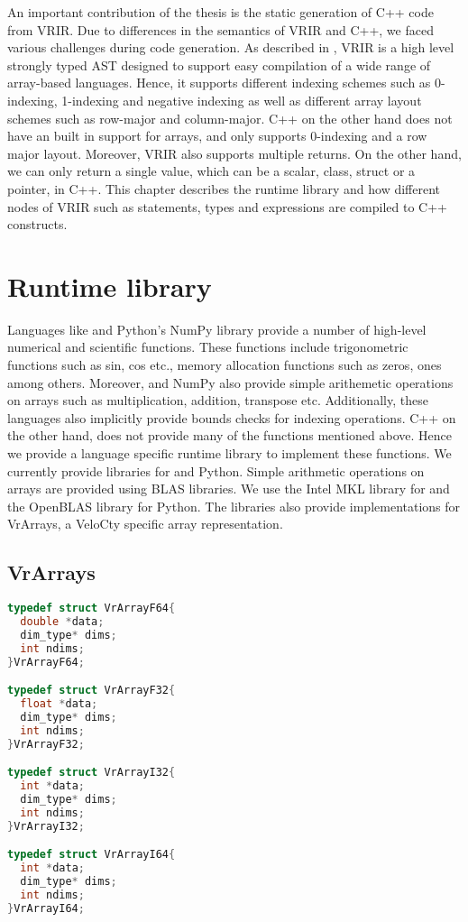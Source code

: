An important contribution of the thesis is the static generation of C++ code from VRIR. Due to differences in the semantics of VRIR and C++, we faced various challenges during code generation. As described in , VRIR is a high level strongly typed AST designed to support easy compilation of a wide range of array-based languages. Hence, it supports different indexing schemes such as 0-indexing, 1-indexing and negative indexing as well as different array layout schemes such as row-major and column-major. C++ on the other hand does not have an built in support for arrays, and only supports 0-indexing and a row major layout. Moreover, VRIR also supports multiple returns. On the other hand, we can only return a single value, which can be a scalar, class, struct or a pointer, in C++. This chapter describes the runtime library and how different nodes of VRIR such as statements, types and expressions are compiled to C++ constructs. 
\section{Runtime library}
\label{sec:runtime}
Languages like \matlab and Python's NumPy library provide a number of high-level numerical and scientific functions. These functions include trigonometric functions such as sin, cos etc., memory allocation functions such as zeros, ones among others. Moreover, \matlab and NumPy also provide simple arithemetic operations on arrays such as multiplication, addition, transpose etc. Additionally, these languages also implicitly provide bounds checks for indexing operations. C++ on the other hand, does not provide many of the functions mentioned above. Hence we provide a language specific runtime library to implement these functions. We currently provide libraries for \matlab and Python. Simple arithmetic operations on arrays are provided using BLAS libraries. We use the Intel MKL library for \matlab and the OpenBLAS library for Python. The libraries also provide implementations for VrArrays, a VeloCty specific array representation. 
\subsection{VrArrays}
\label{subsec:vrarrays}
\begin{lstlisting}[float,language=c, label={vrArrayF64Structreal}, caption={Structure of VrArrays for real data}]
typedef struct VrArrayF64{
  double *data;
  dim_type* dims;  
  int ndims;
}VrArrayF64;

typedef struct VrArrayF32{
  float *data;
  dim_type* dims;  
  int ndims;
}VrArrayF32;

typedef struct VrArrayI32{
  int *data;
  dim_type* dims;  
  int ndims;
}VrArrayI32;

typedef struct VrArrayI64{
  int *data;
  dim_type* dims;  
  int ndims;
}VrArrayI64;

\end{lstlisting}


